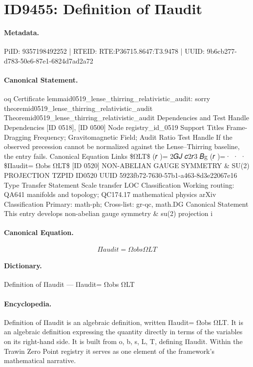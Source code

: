 \section*{ID9455: Definition of Πaudit}
\paragraph{Metadata.}
PiID: 9357198492252 | RTEID: RTE:P36715.8647:T3.9478 | UUID: 9b6cb277-d783-50e6-87e1-6824d7ad2a72

\paragraph{Canonical Statement.}
oq Certificate lemmaid0519\_lense\_thirring\_relativistic\_audit: sorry theoremid0519\_lense\_thirring\_relativistic\_audit Theoremid0519\_lense\_thirring\_relativistic\_audit Dependencies and Test Handle Dependencies [ID 0518], [ID 0500] Node registry\_id\_0519 Support Titles Frame-Dragging Frequency; Gravitomagnetic Field; Audit Ratio Test Handle If the observed precession cannot be normalized against the Lense–Thirring baseline, the entry fails. Canonical Equation Links \$ΩLT\$ (𝑟 )= 2𝐺𝐽 𝑐2𝑟3 𝐵g (𝑟 )=· · · \$Πaudit= Ωobs ΩLT\$ [ID 0520] NON-ABELIAN GAUGE SYMMETRY \& SU(2) PROJECTION TZPID ID0520 UUID 5923fb72-7630-57b1-a463-8d3e22067e16 Type Transfer Statement Scale transfer LOC Classification Working routing: QA641 manifolds and topology; QC174.17 mathematical physics arXiv Classification Primary: math-ph; Cross-list: gr-qc, math.DG Canonical Statement This entry develops non-abelian gauge symmetry \& su(2) projection i

\paragraph{Canonical Equation.}
\[
Πaudit= Ωobs ΩLT
\]

\paragraph{Dictionary.}
Definition of Πaudit — Πaudit= Ωobs ΩLT

\paragraph{Encyclopedia.}
Definition of Πaudit is an algebraic definition, written Πaudit= Ωobs ΩLT. It is an algebraic definition expressing the quantity directly in terms of the variables on its right-hand side. It is built from o, b, s, L, T, defining Πaudit. Within the Trawin Zero Point registry it serves as one element of the framework's mathematical narrative.
